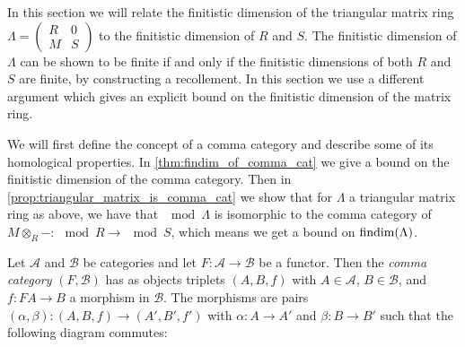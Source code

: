In this section we will relate the finitistic dimension of the triangular matrix ring $\Lambda = \begin{pmatrix}
R & 0\\
M& S
\end{pmatrix}$ to the finitistic dimension of $R$ and $S$. The finitistic dimension of $\Lambda$ can be shown to be finite if and only if the finitistic dimensions of both $R$ and $S$ are finite, by constructing a recollement. In this section we use a different argument which gives an explicit bound on the finitistic dimension of the matrix ring.

We will first define the concept of a comma category and describe some of its homological properties. In \cref{thm:findim_of_comma_cat} we give a bound on the finitistic dimension of the comma category. Then in \cref{prop:triangular_matrix_is_comma_cat} we show that for $\Lambda$ a triangular matrix ring as above, we have that $\mod \Lambda$ is isomorphic to the comma category of $M\otimes_R - \colon \mod R \to \mod S$, which means we get a bound on $\operatorname{findim}(\Lambda)$.

\begin{defn}
	Let $\mathcal A$ and $\mathcal B$ be categories and let $F\colon\mathcal A \to \mathcal B$ be a functor. Then the \emph{comma category} $(F, \mathcal  B)$ has as objects triplets $(A, B, f)$ with $A \in \mathcal  A$, $B \in \mathcal  B$, and $f\colon FA \to B$ a morphism in $\mathcal  B$. The morphisms are pairs $(\alpha, \beta)\colon(A, B, f) \to (A', B', f')$ with $\alpha\colon A \to A'$ and $\beta\colon B \to B'$ such that the following diagram commutes:
	\begin{center}
	\end{center}
\end{defn}

